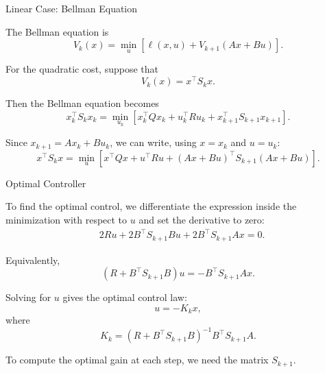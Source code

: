 \documentclass{beamer}
\begin{document}
\begin{frame}{Linear Case: Bellman Equation}
	\begin{flushleft}
		
		The Bellman equation is
		\[
		V_k(x)=\min_u
		\left[
		\ell(x,u)+V_{k+1}(Ax+Bu)
		\right].
		\]
		
		For the quadratic cost, suppose that
		\[
		V_k(x)=x^\top S_kx.
		\]
		
		Then the Bellman equation becomes
		\[
		x_k^\top S_kx_k
		=\min_{u_k}\left[
		x_k^\top Qx_k+u_k^\top Ru_k
		+x_{k+1}^\top S_{k+1}x_{k+1}
		\right].
		\]
		
		\medskip
		
		Since $x_{k+1}=Ax_k+Bu_k$, we can write, using
		$x=x_k$ and $u=u_k$:
		\[
		\boxed{
			x^\top S_kx=\min_u
			\left[
			x^\top Qx+u^\top Ru
			+(Ax+Bu)^\top S_{k+1}(Ax+Bu)
			\right].
		}
		\]
		
	\end{flushleft}
\end{frame}

\begin{frame}{Optimal Controller}
	\begin{flushleft}
		
		To find the optimal control, we differentiate the
		expression inside the minimization with respect to $u$
		and set the derivative to zero:
		\[
		\begin{aligned}
			&2Ru+2B^\top S_{k+1}Bu +2B^\top S_{k+1}Ax=0.
		\end{aligned}
		\]
		
		Equivalently,
		\[
		(R+B^\top S_{k+1}B)u
		=-B^\top S_{k+1}Ax.
		\]
		
		\medskip
		
		Solving for $u$ gives the optimal control law:
		\[
		\boxed{
			u=-K_kx,
		}
		\]
		where
		\[
		\boxed{
			K_k=(R+B^\top S_{k+1}B)^{-1}
			B^\top S_{k+1}A.
		}
		\]
		
		\medskip
		
		To compute the optimal gain at each step, we need
		the matrix $S_{k+1}$.
		
	\end{flushleft}
\end{frame}
\end{document}
